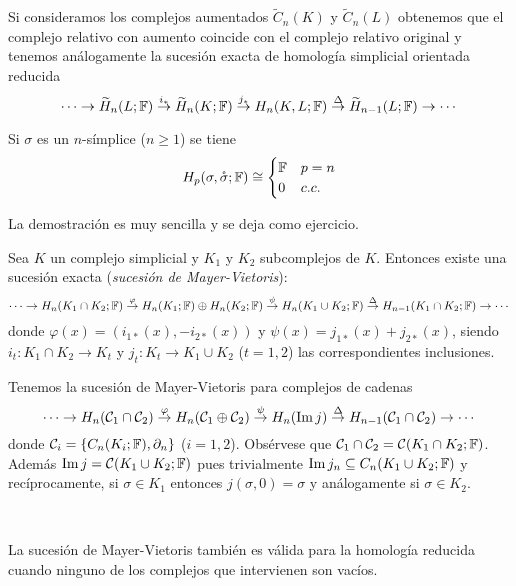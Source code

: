 \documentclass[HS.tex]{subfiles}
\begin{document}
\begin{nota}
Si consideramos los complejos aumentados $\widetilde{C}_n(K)$ y $\widetilde{C}_n(L)$ obtenemos que el complejo relativo con aumento coincide con el complejo relativo original y tenemos análogamente la sucesión exacta de homología simplicial orientada reducida
\[
\cdots\to \widetilde{H}_n(L;\mathbb{F})\overset{i_*}{\to} \widetilde{H}_n(K;\mathbb{F})\overset{j_*}{\to} H_n(K,L;\mathbb{F})\overset{\Delta}{\to} \widetilde{H}_{n-1}(L;\mathbb{F})\to\cdots
\]
\end{nota}

\begin{prop}
Si $\sigma$ es un $n$-símplice ($n\geq 1$) se tiene
\[
H_p(\sigma,\mathring{\sigma};\mathbb{F})\cong\begin{cases}
\mathbb{F} & p=n\\
0 & c.c.
\end{cases}
\]
\end{prop}

La demostración es muy sencilla y se deja como ejercicio. 

\begin{prop}
Sea $K$ un complejo simplicial y $K_1$ y $K_2$ subcomplejos de $K$. Entonces existe una sucesión exacta (\emph{sucesión de Mayer-Vietoris}):
\[
\cdots\to H_n(K_1\cap K_2;\mathbb{F})\overset{\varphi}{\to}H_n(K_1;\mathbb{F})\oplus H_n(K_2;\mathbb{F})\overset{\psi}{\to}H_n(K_1\cup K_2;\mathbb{F})\overset{\Delta}{\to}H_{n-1}(K_1\cap K_2;\mathbb{F})\to\cdots
\]
donde $\varphi(x)=(i_{1*}(x),-i_{2*}(x))$ y $\psi(x)=j_{1*}(x)+j_{2*}(x)$, siendo $i_t:K_1\cap K_2\to K_t$ y $j_t:K_t\to K_1\cup K_2$  ($t=1,2$) las correspondientes inclusiones.
\end{prop}

\begin{dem}
Tenemos la sucesión de Mayer-Vietoris para complejos de cadenas
\[
\cdots\to H_n(\mathcal{C}_1\cap\mathcal{C}_2)\overset{\varphi}{\to}H_n(\mathcal{C}_1\oplus\mathcal{C}_2)\overset{\psi}{\to}H_n(\operatorname{Im}{j})\overset{\Delta}{\to}H_{n-1}(\mathcal{C}_1\cap\mathcal{C}_2)\to\cdots
\]
donde $\mathcal{C}_i=\{C_n(K_i;\mathbb{F}),\partial_n\}$ ($i=1,2$). Obsérvese que $\mathcal{C}_1\cap\mathcal{C}_2=\mathcal{C}(K_1\cap K_2;\mathbb{F})$. Además $\operatorname{Im}{j}=\mathcal{C}(K_1\cup K_2;\mathbb{F})$ pues trivialmente $\operatorname{Im}{j_n}\subseteq C_n(K_1\cup K_2;\mathbb{F})$ y recíprocamente, si $\sigma\in K_1$ entonces $j(\sigma,0)=\sigma$ y análogamente si $\sigma\in K_2$. 
\QED
\end{dem}

\begin{nota}\
\begin{enumerate}
La sucesión de Mayer-Vietoris también es válida para la homología reducida cuando ninguno de los complejos que intervienen son vacíos.
\end{enumerate}
\end{nota}
\end{document}

